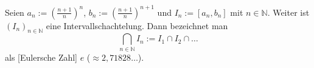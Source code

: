 Seien $a_n := (\frac{n+1}{n})^n$, $b_n := (\frac{n+1}{n})^{n+1}$ und $I_n := [a_n, b_n]$ mit $n \in \mathbb{N}$. Weiter ist $(I_n)_{n \in \mathbb{N}}$ eine Intervallschachtelung. Dann bezeichnet man
$$\bigcap_{n \in \mathbb{N}} I_n := I_1 \cap I_2 \cap \dots$$
als [Eulersche Zahl] $e$ ($\approx 2,71828 \dots$).